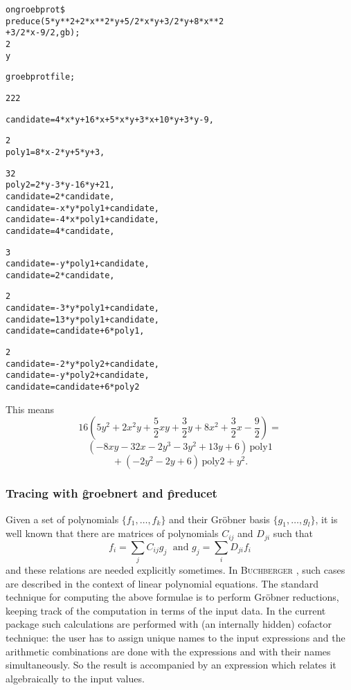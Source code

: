 \example {}

\begin{alltt}
  on groebprot\$ \\
  preduce(5*y**2 + 2*x**2*y + 5/2*x*y + 3/2*y + 8*x**2 \\
\hspace*{+1cm} + 3/2*x - 9/2, gb);\\[\baselineskip]

      2
     y

groebprotfile;

                  2         2                     2
    {candidate=4*x *y + 16*x  + 5*x*y + 3*x + 10*y  + 3*y - 9,

              2
     poly1=8*x - 2*y  + 5*y + 3,

              3      2
     poly2=2*y  - 3*y  - 16*y + 21,
     candidate=2*candidate,
     candidate= - x*y*poly1 + candidate,
     candidate= - 4*x*poly1 + candidate,
     candidate=4*candidate,

                   3
     candidate= - y *poly1 + candidate,
     candidate=2*candidate,

                     2
     candidate= - 3*y *poly1 + candidate,
     candidate=13*y*poly1 + candidate,
     candidate=candidate + 6*poly1,

                     2
     candidate= - 2*y *poly2 + candidate,
     candidate= - y*poly2 + candidate,
     candidate=candidate + 6*poly2}
\end{alltt}
This means
\[
16 (5 y^2 + 2 x^2 y + \frac{5}{2} x y + \frac{3}{2} y
+ 8 x^2+ \frac{3}{2} x - \frac{9}{2})=
\]
\[
(-8 x y -32 x -2 y^3 -3 y^2 + 13 y + 6)\,\mbox{poly1}
\]
\[
\mbox{} + (-2 y^2 -2 y + 6)\,\mbox{poly2} + y^2.
\]

\subsubsection{Tracing with \f{groebnert} and \f{preducet}}
Given a set of polynomials $\{f_1,\ldots ,f_k\}$ and their Gr\"obner
basis $\{g_1,\ldots ,g_l\}$, it is well known that there are matrices of
polynomials $C_{ij}$ and $D_{ji}$ such that
\[
f_i = \displaystyle{\sum\limits_j} C_{ij} g_j \;\mbox{  and  } g_j =
\displaystyle{\sum\limits_i} D_{ji} f_i
\]
and these relations are needed explicitly sometimes.
In \textsc{Buchberger} \cite{Buchberger:85}, such cases are described in the
context of linear polynomial equations. The standard technique for
computing the above formulae is to perform
Gr\"obner reductions, keeping track of the
computation in terms of the input data. In the current package such
calculations are performed with (an internally hidden) cofactor
technique: the user has to assign unique names to the input
expressions and the  arithmetic combinations are done with the
expressions and with their names simultaneously. So the result is
accompanied by an expression which relates it algebraically to the
input values.

